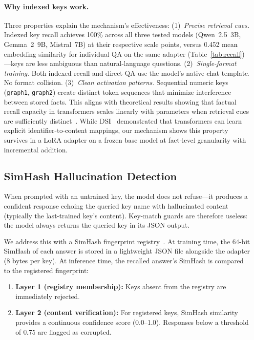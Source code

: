 \documentclass[11pt]{article}
\begin{document}
\paragraph{Why indexed keys work.}
Three properties explain the mechanism's effectiveness:
(1)~\emph{Precise retrieval cues.} Indexed key recall achieves 100\% across all three tested models (Qwen~2.5~3B, Gemma~2~9B, Mistral~7B) at their respective scale points, versus 0.452 mean embedding similarity for individual QA on the same adapter (Table~\ref{tab:recall})---keys are less ambiguous than natural-language questions.
(2)~\emph{Single-format training.} Both indexed recall and direct QA use the model's native chat template. No format collision.
(3)~\emph{Clean activation patterns.} Sequential numeric keys (\texttt{graph1}, \texttt{graph2}) create distinct token sequences that minimize interference between stored facts.
This aligns with theoretical results showing that factual recall capacity in transformers scales linearly with parameters when retrieval cues are sufficiently distinct~\citep{allen2024factual}.
While DSI~\citep{tay2022dsi} demonstrated that transformers can learn explicit identifier-to-content mappings, our mechanism shows this property survives in a LoRA adapter on a frozen base model at fact-level granularity with incremental addition.

\subsection{SimHash Hallucination Detection}
\label{sec:simhash}

When prompted with an untrained key, the model does not refuse---it produces a confident response echoing the queried key name with hallucinated content (typically the last-trained key's content).
Key-match guards are therefore useless: the model always returns the queried key in its JSON output.

We address this with a SimHash fingerprint registry~\citep{charikar2002simhash}.
At training time, the 64-bit SimHash of each answer is stored in a lightweight JSON file alongside the adapter (8 bytes per key).
At inference time, the recalled answer's SimHash is compared to the registered fingerprint:

\begin{enumerate}
    \item \textbf{Layer 1 (registry membership):} Keys absent from the registry are immediately rejected.
    \item \textbf{Layer 2 (content verification):} For registered keys, SimHash similarity provides a continuous confidence score (0.0--1.0). Responses below a threshold of 0.75 are flagged as corrupted.
\end{enumerate}
\end{document}
